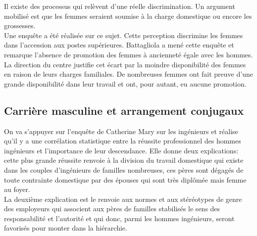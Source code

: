 \documentclass[10pt, a4paper, openany]{book}
\begin{document}
Il existe des processus qui relèvent d'une réelle discrimination. Un argument mobilisé est que les femmes seraient soumise à la charge domestique ou encore les grossesses. \\
Une enquête a été réalisée sur ce sujet. Cette perception discrimine les femmes dans l'accession aux postes supérieures. Battagliola a mené cette enquête et remarque l'absence de promotion des femmes à ancienneté égale avec les hommes. \\
La direction du centre justifie cet écart par la moindre disponibilité des femmes en raison de leurs charges familiales. De nombreuses femmes ont fait preuve d'une grande disponibilité dans leur travail et ont, pour autant, eu aucune promotion. 

\subsection{Carrière masculine et arrangement conjugaux}

On va s'appuyer sur l'enquête de Catherine Mary sur les ingénieurs et réalise qu'il y a une corrélation statistique entre la réussite professionnel des hommes ingénieurs et l'importance de leur descendance. Elle donne deux explications: cette plus grande réussite renvoie à la division du travail domestique qui existe dans les couples d'ingénieurs de familles nombreuses, ces pères sont dégagés de toute contrainte domestique par des épouses qui sont très diplômée mais femme au foyer. \\
La deuxième explication est le renvoie aux normes et aux stéréotypes de genre des employeurs qui associent aux pères de familles stabilisés le sens des responsabilité et l'autorité et qui donc, parmi les hommes ingénieurs, seront favorisés pour monter dans la hiérarchie.
\end{document}
